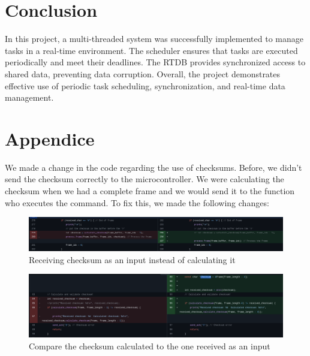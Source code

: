 \documentclass[a4paper,12pt]{article}
\begin{document}
\section{Conclusion}
In this project, a multi-threaded system was successfully implemented to manage tasks in a real-time environment. The scheduler ensures that tasks are executed periodically and meet their deadlines. The RTDB provides synchronized access to shared data, preventing data corruption. Overall, the project demonstrates effective use of periodic task scheduling, synchronization, and real-time data management.

\section{Appendice}
We made a change in the code regarding the use of checksums. Before, we didn't send the checksum correctly to the microcontroller. We were calculating the checksum when we had a complete frame and we would send it to the function who executes the command. To fix this, we made the following changes:
\begin{figure}[H]
    \centering
    \includegraphics[width=1\linewidth]{checksum_change.png}
    \caption{Receiving checksum as an input instead of calculating it}
    \label{fig:checksum_change}
\end{figure}

\begin{figure}[H]
    \centering
    \includegraphics[width=1\linewidth]{checksum_change1.png}
    \caption{Compare the checksum calculated to the one received as an input}
    \label{fig:checksum_change1}
\end{figure}
\end{document}
